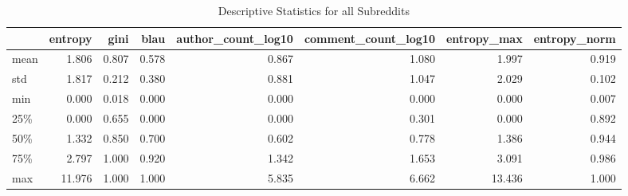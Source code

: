 \begin{table}
\centering
\begin{tabular}{lrrrrrrr}
\toprule
{} &  entropy &  gini &  blau &  author\_count\_log10 &  comment\_count\_log10 &  entropy\_max &  entropy\_norm \\
\midrule
mean &    1.806 & 0.807 & 0.578 &               0.867 &                1.080 &        1.997 &         0.919 \\
std  &    1.817 & 0.212 & 0.380 &               0.881 &                1.047 &        2.029 &         0.102 \\
min  &    0.000 & 0.018 & 0.000 &               0.000 &                0.000 &        0.000 &         0.007 \\
25\%  &    0.000 & 0.655 & 0.000 &               0.000 &                0.301 &        0.000 &         0.892 \\
50\%  &    1.332 & 0.850 & 0.700 &               0.602 &                0.778 &        1.386 &         0.944 \\
75\%  &    2.797 & 1.000 & 0.920 &               1.342 &                1.653 &        3.091 &         0.986 \\
max  &   11.976 & 1.000 & 1.000 &               5.835 &                6.662 &       13.436 &         1.000 \\
\bottomrule
\end{tabular}
\caption{Descriptive Statistics for all Subreddits}
\label{table/all}
\end{table}